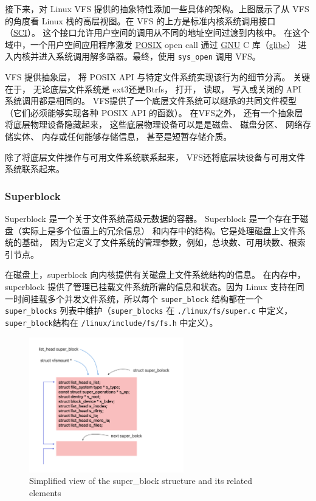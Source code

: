 \documentclass[UTF8,a4paper]{ctexart}
\newcommand{\code}{\texttt}
\begin{document}
接下来，对 Linux VFS 提供的抽象特性添加一些具体的架构。上图展示了从 VFS
的角度看 Linux 栈的高层视图。在 VFS
的上方是标准内核系统调用接口
（\href{https://en.wikipedia.org/wiki/Scalable_Coherent_Interface}{SCI}）。
这个接口允许用户空间的调用从不同的地址空间过渡到内核中。
在这个域中，一个用户空间应用程序激发
\href{https://en.wikipedia.org/wiki/POSIX}{POSIX} open call 通过
\href{https://en.wikipedia.org/wiki/GNU}{GNU} C
库（\href{https://en.wikipedia.org/wiki/Glibc}{glibc}）
进入内核并进入系统调用解多路器。最终，使用
\code{sys\_open} 调用 VFS。

VFS 提供抽象层，
将 POSIX API
与特定文件系统实现该行为的细节分离。
关键在于，
无论底层文件系统是
ext3还是Btrfs，
打开，
读取，
写入或关闭的 API
系统调用都是相同的。
VFS提供了一个底层文件系统可以继承的共同文件模型
（它们必须能够实现各种
POSIX API
的函数）。
在VFS之外，
还有一个抽象层将底层物理设备隐藏起来，
这些底层物理设备可以是是磁盘、
磁盘分区、
网络存储实体、
内存或任何能够存储信息，
甚至是短暂存储介质。

除了将底层文件操作与可用文件系统联系起来，
VFS还将底层块设备与可用文件系统联系起来。

\subsubsection{Superblock}

Superblock 是一个关于文件系统高级元数据的容器。
Superblock
是一个存在于磁盘（实际上是多个位置上的冗余信息）
和内存中的结构。它是处理磁盘上文件系统的基础，
因为它定义了文件系统的管理参数，例如，总块数、可用块数、根索引节点。

在磁盘上，superblock
向内核提供有关磁盘上文件系统结构的信息。
在内存中，superblock
提供了管理已挂载文件系统所需的信息和状态。因为 Linux
支持在同一时间挂载多个并发文件系统，所以每个 \texttt{super\_block}
结构都在一个 \texttt{super\_blocks} 列表中维护（\texttt{super\_blocks}
在 \texttt{./linux/fs/super.c} 中定义，\texttt{super\_block}结构在
\texttt{/linux/include/fs/fs.h} 中定义）。

\begin{figure}[H]
    \centering
    \includegraphics[width=0.6\textwidth]{Simplified view of the super_block structure and its related elements.png}
    \caption{Simplified view of the super\_block structure and its related elements}
\end{figure}
\end{document}
